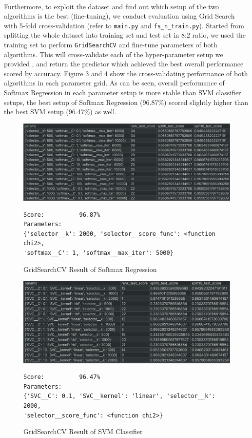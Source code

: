 \documentclass{article}
\begin{document}
\paragraph{}
Furthermore, to exploit the dataset and find out which setup of the two algorithms is the best (fine-tuning), we conduct evaluation using Grid Search with 5-fold cross-validation (refer to \texttt{main.py} and \texttt{fs_n_train.py}). Started from splitting the whole dataset into training set and test set in 8:2 ratio, we used the training set to perform \texttt{GridSearchCV} and fine-tune parameters of both algorithms. This will cross-validate each of the hyper-parameter setup we provided %
, and return the predictor which achieved the best overall performance scored by accuracy. Figure 3 and 4 show the cross-validating performance of both algorithms in each parameter grid. As can be seen,
overall performance of Softmax Regression in each parameter setup is more stable than SVM classifier setups, the best setup of Softmax Regression (96.87\%) scored  slightly higher than the best SVM setup (96.47\%) as well.
\renewcommand{\thefigure}{3}
\begin{figure}[H]
				\centerline{\includegraphics[scale=.3]{./test1_csv.png}}
						\begin{verbatim}
Score:          96.87%
Parameters: 
{'selector__k': 2000, 'selector__score_func': <function chi2>, 
'softmax__C': 1, 'softmax__max_iter': 5000}
		\end{verbatim}
					\caption{GridSearchCV Result of Softmax Regression}
\end{figure}
				
\renewcommand{\thefigure}{4}
\begin{figure}[H]
				\centerline{\includegraphics[scale=.3]{./test2_csv.png}}
\begin{verbatim}
Score:          96.47%
Parameters:	
{'SVC__C': 0.1, 'SVC__kernel': 'linear', 'selector__k': 2000,
'selector__score_func': <function chi2>}
\end{verbatim}
					\caption{GridSearchCV Result of SVM Classifier}
\end{figure}
\end{document}
